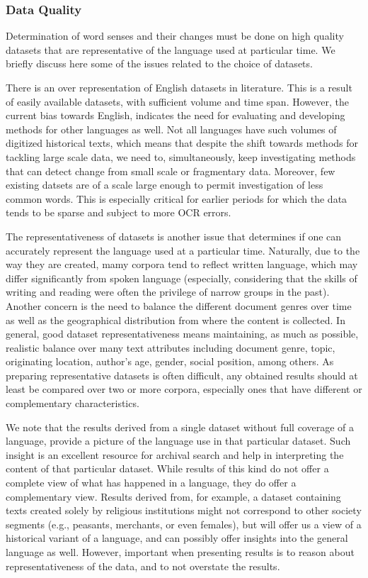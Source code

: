\documentclass[output=paper]{langsci/langscibook}
\begin{document}
\subsubsection{Data Quality}

Determination of word senses and their changes must be done on high quality datasets that are representative of the language used at particular time. We briefly discuss here some of the issues related to the choice of datasets.

There is an over representation of English datasets in literature. This is a result of easily available datasets, with sufficient volume and time span. However, the current bias towards English, indicates the need for evaluating and developing methods for other languages as well. Not all languages have such volumes of digitized historical texts, which means that despite the shift towards methods for tackling large scale data, we need to, simultaneously, keep investigating methods that can detect change from small scale or fragmentary data.
Moreover, few existing datsets are of a scale large enough to permit investigation of less common words. This is especially critical for earlier periods for which the data tends to be sparse and subject to more OCR errors.

The representativeness of datasets is another issue that determines if one can accurately represent the language used at a particular time. Naturally, due to the way they are created, mamy corpora tend to reflect written language, which may differ significantly from spoken language (especially, considering that the skills of writing and reading were often the privilege of narrow groups in the past). Another concern is the need to balance the different document genres over time as well as the geographical distribution from where the content is collected. In general, good dataset representativeness means maintaining, as much as possible, realistic balance over many text attributes including document genre, topic, originating location, author's age, gender, social position, among others. As preparing representative datasets is often difficult, any obtained results should at least be compared over two or more corpora, especially ones that have different or complementary
characteristics.

We note that the results derived from a single dataset without full coverage of a language, provide a picture of the language use in that particular dataset. Such insight is an excellent resource for archival search and help in interpreting the content of that particular dataset. While results of this kind do not offer a complete view of what has happened in a language, they do offer a complementary view. Results derived from, for example, a dataset containing texts created solely by religious institutions might not correspond to other society segments (e.g., peasants, merchants, or even females), but will offer us a view of a historical variant of a language, and can possibly offer insights into the general language as well. However, important when presenting results is to reason about representativeness of the data, and to not overstate the results.  
\fi
\end{document}
